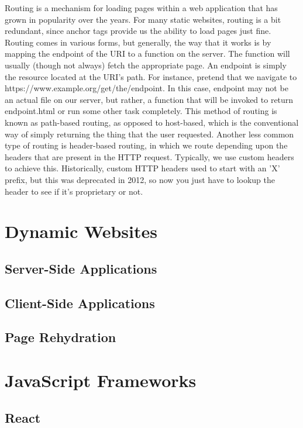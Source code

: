 \documentclass{article}
\begin{document}
Routing is a mechanism for loading pages within a web application that has grown in popularity over the years. 
For many static websites, routing is a bit redundant, since anchor tags provide us the ability to load pages 
just fine. Routing comes in various forms, but generally, the way that it works is by mapping the endpoint of 
the URI to a function on the server. The function will usually (though not always) fetch the appropriate page. 
An endpoint is simply the resource located at the URI's path. For instance, pretend that we navigate to 
https://www.example.org/get/the/endpoint. In this case, endpoint may not be an actual file on our server, but 
rather, a function that will be invoked to return endpoint.html or run some other task completely. This 
method of routing is known as path-based routing, as opposed to host-based, which is the conventional way of 
simply returning the thing that the user requested. Another less common type of routing is header-based 
routing, in which we route depending upon the headers that are present in the HTTP request. Typically, we use 
custom headers to achieve this. Historically, custom HTTP headers used to start with an 'X' prefix, but this 
was deprecated in 2012, so now you just have to lookup the header to see if it's proprietary or not. 

\section{Dynamic Websites}

\subsection{Server-Side Applications}

\subsection{Client-Side Applications}

\subsection{Page Rehydration}

\section{JavaScript Frameworks}

\subsection{React}
\end{document}
